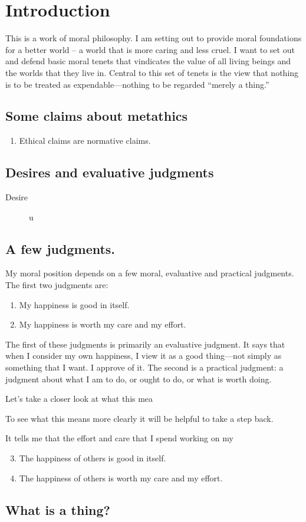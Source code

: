 \chapter{Introduction}
\label{ch:int}
This is a work of moral philosophy.
I am setting out to provide moral foundations for a better world -- a world that
is more caring and less cruel. 
I want to set out and defend basic moral tenets that vindicates the value of all
living beings and the worlds that they live in.
Central to this set of tenets is the view that nothing is to be treated as
expendable---nothing to be regarded ``merely a thing.''
\section{Some claims about metathics}
\label{sec:orge34c5bf}

\begin{enumerate}
\item Ethical claims are normative claims.
\end{enumerate}
\section{Desires and evaluative judgments}
\label{sec:org7b4b7ea}
\begin{description}
\item[{Desire}] u
\end{description}
\section{A few judgments.}
\label{sec:judgments}
My moral position depends on a few moral, evaluative and practical judgments.
The first two judgments are:
\begin{enumerate}
\item My happiness is good in itself.
\item My happiness is worth my care and my effort.
\end{enumerate}
The first of these judgments is primarily an evaluative judgment.
It says that when I consider my own happiness, I view it as a good thing---not
simply as something that I want.
I approve of it.
The second is a practical judgment: a judgment about what I am to do, or ought to
do, or what is worth doing.

Let's take a closer look at what this mea

To see what this means more clearly it will be helpful to take a step back.


It tells me that the effort and care that I spend working on my

\begin{enumerate}
\setcounter{enumi}{2}
\item The happiness of others is good in itself.
\item The happiness of others is worth my care and my effort.
\end{enumerate}
\section{What is a thing?}
\label{sec:whatisthing}
